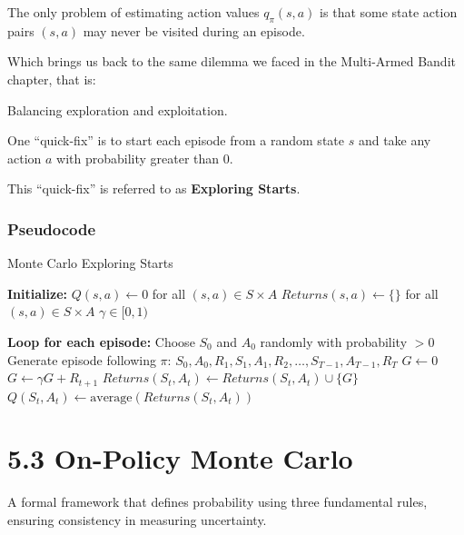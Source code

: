 \documentclass[
  letterpaper,
  DIV=11,
  numbers=noendperiod]{scrreprt}
\begin{document}
The only problem of estimating action values \(q_{\pi}(s,a)\) is that
some state action pairs \((s,a)\) may never be visited during an
episode.

Which brings us back to the same dilemma we faced in the Multi-Armed
Bandit chapter, that is:

Balancing exploration and exploitation.

One ``quick-fix'' is to start each episode from a random state \(s\) and
take any action \(a\) with probability greater than \(0\).

This ``quick-fix'' is referred to as \textbf{Exploring Starts}.

\subsection{Pseudocode}\label{pseudocode-6}

\begin{algorithm}[htb!]
\caption{Monte Carlo Exploring Starts}
\begin{algorithmic}[1]
\State \textbf{Initialize:} 
\State $Q(s, a) \gets 0$ for all $(s, a) \in S \times A$
\State $Returns(s, a) \gets \{\}$ for all $(s, a) \in S \times A$
\State $\gamma \in [0, 1)$

\State \textbf{Loop for each episode:}
\State Choose $S_{0}$ and $A_{0}$ randomly with probability $> 0$
\State Generate episode following $\pi$: $S_{0}, A_{0}, R_{1}, S_{1}, A_{1}, R_{2}, \dots, S_{T-1}, A_{T-1}, R_{T}$
\State $G \gets 0$
    \State $G \gets \gamma G + R_{t+1}$
      
        \State $Returns(S_{t}, A_{t}) \gets Returns(S_{t}, A_{t}) \cup \{G\}$
        \State $Q(S_{t}, A_{t}) \gets \text{average}(Returns(S_{t}, A_{t}))$
    \Endif
\Endfor

\end{algorithmic}
\end{algorithm}

\chapter{5.3 On-Policy Monte Carlo}\label{on-policy-monte-carlo-1}

\begin{tcolorbox}[enhanced jigsaw, arc=.35mm, toprule=.15mm, leftrule=.75mm, colback=white, left=2mm, colframe=quarto-callout-note-color-frame, rightrule=.15mm, opacityback=0, breakable, bottomrule=.15mm]

A formal framework that defines probability using three fundamental
rules, ensuring consistency in measuring uncertainty. 🎲

\end{tcolorbox}
\end{document}
